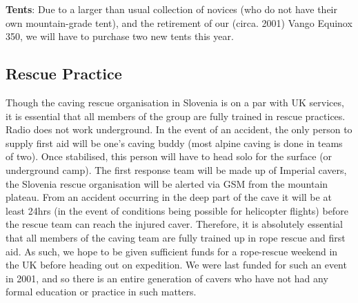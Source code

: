 \textbf{Tents}: Due to a larger than usual collection of novices (who do not have their own mountain-grade tent), and the retirement of our (circa. 2001) Vango Equinox 350, we will have to purchase two new tents this year.


\subsection{Rescue Practice}

Though the caving rescue organisation in Slovenia is on a par with UK services, it is essential that all members of the group are fully trained in rescue practices. Radio does not work underground. In the event of an accident, the only person to supply first aid will be one's caving buddy (most alpine caving is done in teams of two). Once stabilised, this person will have to head solo for the surface (or underground camp). The first response team will be made up of Imperial cavers, the Slovenia rescue organisation will be alerted via GSM from the mountain plateau. From an accident occurring in the deep part of the cave it will be at least 24hrs (in the event of conditions being possible for helicopter flights) before the rescue team can reach the injured caver. Therefore, it is absolutely essential that all members of the caving team are fully trained up in rope rescue and first aid. As such, we hope to be given sufficient funds for a rope-rescue weekend in the UK before heading out on expedition. We were last funded for such an event in 2001, and so there is an entire generation of cavers who have not had any formal education or practice in such matters.
